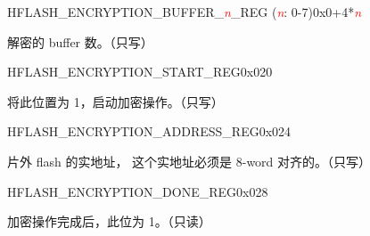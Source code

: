 \begin{register}{H}{FLASH\_ENCRYPTION\_BUFFER\_\textcolor{red}{\it{n}}\_REG (\textcolor{red}{\it{n}}: 0-7)}{0x0+4*\textcolor{red}{\it{n}}}\label{regdesc:FLASHENCRYPTIONBUFFERnREG}
%
\regnewline%
\begin{regdesc}\begin{reglist}
\item [FLASH\_ENCRYPTION\_BUFFER\_\textcolor{red}{\it{n}}\_REG] 解密的 buffer 数。（只写）
\end{reglist}\end{regdesc}
\end{register}


\begin{register}{H}{FLASH\_ENCRYPTION\_START\_REG}{0x020}\label{regdesc:FLASHENCRYPTIONSTARTREG}
%
%
\regnewline%
\begin{regdesc}\begin{reglist}
\item [FLASH\_START] 将此位置为 1，启动加密操作。（只写）
\end{reglist}\end{regdesc}
\end{register}


\begin{register}{H}{FLASH\_ENCRYPTION\_ADDRESS\_REG}{0x024}\label{regdesc:FLASHENCRYPTIONADDRESSREG}
%
\regnewline%
\begin{regdesc}\begin{reglist}
\item [FLASH\_ENCRYPTION\_ADDRESS\_REG] 片外 flash 的实地址，
这个实地址必须是 8-word 对齐的。（只写）
\end{reglist}\end{regdesc}
\end{register}


\begin{register}{H}{FLASH\_ENCRYPTION\_DONE\_REG}{0x028}\label{regdesc:FLASHENCRYPTIONDONEREG}
%
%
\regnewline%
\begin{regdesc}\begin{reglist}
\item [FLASH\_DONE] 加密操作完成后，此位为 1。（只读）
\end{reglist}\end{regdesc}
\end{register}

